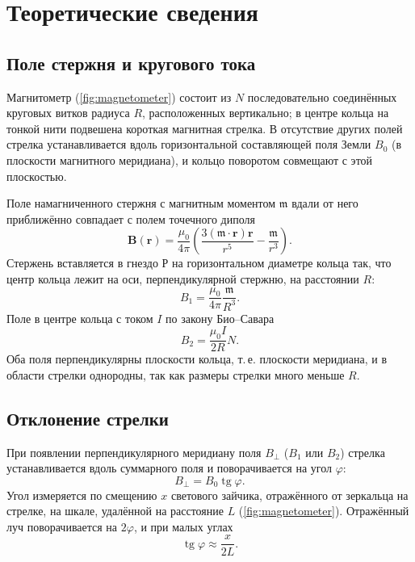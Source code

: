 \documentclass[a4paper,12pt]{article}
\begin{document}
\section{Теоретические сведения}

\subsection{Поле стержня и кругового тока}
Магнитометр (\cref{fig:magnetometer}) состоит из $N$ последовательно
соединённых круговых витков радиуса $R$, расположенных вертикально; в
центре кольца на тонкой нити подвешена короткая магнитная стрелка. В
отсутствие других полей стрелка устанавливается вдоль горизонтальной
составляющей поля Земли $B_0$ (в плоскости магнитного меридиана), и кольцо
поворотом совмещают с этой плоскостью.

Поле намагниченного стержня с магнитным моментом $\mathfrak{m}$ вдали от
него приближённо совпадает с полем точечного диполя
\begin{equation}
    \label{eq:dipole}
    \mathbf{B}(\mathbf{r}) = \frac{\mu_0}{4\pi}
    \left(\frac{3(\boldsymbol{\mathfrak{m}}\cdot\mathbf{r})\mathbf{r}}{r^5}
          - \frac{\boldsymbol{\mathfrak{m}}}{r^3}\right).
\end{equation}
Стержень вставляется в гнездо Р на горизонтальном диаметре кольца так, что
центр кольца лежит на оси, перпендикулярной стержню, на расстоянии $R$:
\begin{equation}
    \label{eq:B1}
    B_1 = \frac{\mu_0}{4\pi}\frac{\mathfrak{m}}{R^3}.
\end{equation}
Поле в центре кольца с током $I$ по закону Био--Савара
\begin{equation}
    \label{eq:B2}
    B_2 = \frac{\mu_0 I}{2R}N.
\end{equation}
Оба поля перпендикулярны плоскости кольца, т.\,е. плоскости меридиана, и
в области стрелки однородны, так как размеры стрелки много меньше $R$.

\subsection{Отклонение стрелки}
При появлении перпендикулярного меридиану поля $B_\perp$ ($B_1$ или $B_2$)
стрелка устанавливается вдоль суммарного поля и поворачивается на угол
$\varphi$:
\begin{equation}
    \label{eq:tan}
    B_\perp = B_0\operatorname{tg}\varphi.
\end{equation}
Угол измеряется по смещению $x$ светового зайчика, отражённого от
зеркальца на стрелке, на шкале, удалённой на расстояние $L$
(\cref{fig:magnetometer}). Отражённый луч поворачивается на $2\varphi$, и при
малых углах
\begin{equation}
    \label{eq:tan_x}
    \operatorname{tg}\varphi \approx \frac{x}{2L}.
\end{equation}
\end{document}
